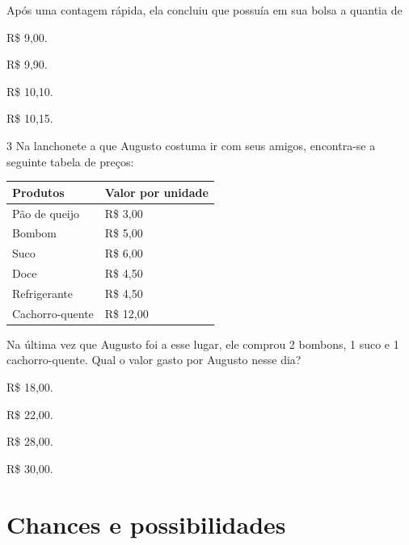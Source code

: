 Após uma contagem rápida, ela concluiu que possuía em sua bolsa a quantia de

\begin{minipage}{.5\textwidth}
\begin{escolha}
\item
  R\$ 9,00.
\item
  R\$ 9,90.
\item
  R\$ 10,10.
\item
  R\$ 10,15.
\end{escolha}
\end{minipage}

\num{3} Na lanchonete a que Augusto costuma ir com seus amigos, encontra-se a
seguinte tabela de preços:

\begin{longtable}[]{@{}ll@{}}
\toprule
Produtos & Valor por unidade\tabularnewline
\midrule
\endhead
Pão de queijo & R\$ 3,00\tabularnewline
Bombom & R\$ 5,00\tabularnewline
Suco & R\$ 6,00\tabularnewline
Doce & R\$ 4,50\tabularnewline
Refrigerante & R\$ 4,50\tabularnewline
Cachorro-quente & R\$ 12,00\tabularnewline
\bottomrule
\end{longtable}

Na última vez que Augusto foi a esse lugar, ele comprou 2 bombons, 1
suco e 1 cachorro-quente. Qual o valor gasto por Augusto nesse dia?

\begin{minipage}{.5\textwidth}
\begin{escolha}
\item
  R\$ 18,00.
\item
  R\$ 22,00.
\item
  R\$ 28,00.
\item
  R\$ 30,00.
\end{escolha}
\end{minipage}

\chapter{Chances e possibilidades}



